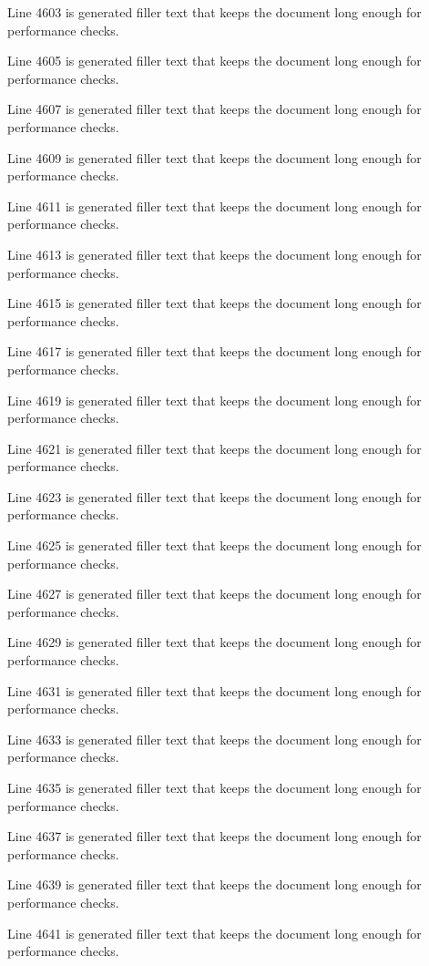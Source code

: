 Line 4603 is generated filler text that keeps the document long enough for performance checks.

Line 4605 is generated filler text that keeps the document long enough for performance checks.

Line 4607 is generated filler text that keeps the document long enough for performance checks.

Line 4609 is generated filler text that keeps the document long enough for performance checks.

Line 4611 is generated filler text that keeps the document long enough for performance checks.

Line 4613 is generated filler text that keeps the document long enough for performance checks.

Line 4615 is generated filler text that keeps the document long enough for performance checks.

Line 4617 is generated filler text that keeps the document long enough for performance checks.

Line 4619 is generated filler text that keeps the document long enough for performance checks.

Line 4621 is generated filler text that keeps the document long enough for performance checks.

Line 4623 is generated filler text that keeps the document long enough for performance checks.

Line 4625 is generated filler text that keeps the document long enough for performance checks.

Line 4627 is generated filler text that keeps the document long enough for performance checks.

Line 4629 is generated filler text that keeps the document long enough for performance checks.

Line 4631 is generated filler text that keeps the document long enough for performance checks.

Line 4633 is generated filler text that keeps the document long enough for performance checks.

Line 4635 is generated filler text that keeps the document long enough for performance checks.

Line 4637 is generated filler text that keeps the document long enough for performance checks.

Line 4639 is generated filler text that keeps the document long enough for performance checks.

Line 4641 is generated filler text that keeps the document long enough for performance checks.

